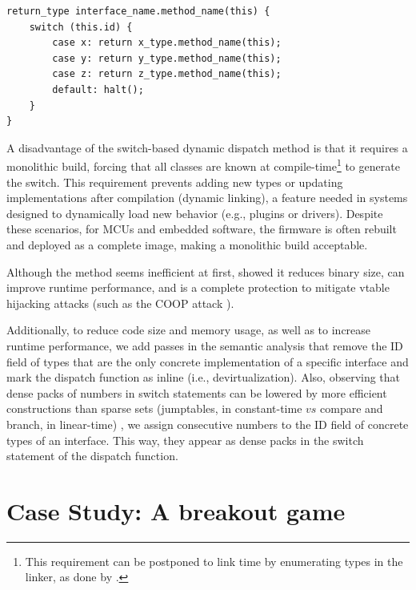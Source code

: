 \documentclass[10pt,sigplan,screen,anonymous]{acmart}
\begin{document}
\begin{lstlisting}[float=tp,caption=Interface switch-based template for dynamic dispatch using the id field., label=lst:interfacestub]
return_type interface_name.method_name(this) {
    switch (this.id) {
        case x: return x_type.method_name(this);
        case y: return y_type.method_name(this);
        case z: return z_type.method_name(this);
        default: halt();
    }
}
\end{lstlisting}


A disadvantage of the switch-based dynamic dispatch method is that it requires a monolithic build, forcing that all classes are known at compile-time\footnote{This requirement can be postponed to link time by enumerating types in the linker, as done by \citet{bauer2021novt}.} to generate the switch. This requirement prevents adding new types or updating implementations after compilation (dynamic linking), a feature needed in systems designed to dynamically load new behavior (e.g., plugins or drivers). Despite these scenarios, for MCUs and embedded software, the firmware is often rebuilt and deployed as a complete image, making a monolithic build acceptable.

Although the method seems inefficient at first, \citet{bauer2021novt} showed it reduces binary size, can improve runtime performance, and is a complete protection to mitigate vtable hijacking attacks (such as the COOP attack \cite{schuster2015}). 

Additionally, to reduce code size and memory usage, as well as to increase runtime performance, we add passes in the semantic analysis that remove the ID field of types that are the only concrete implementation of a specific interface and mark the dispatch function as inline (i.e., devirtualization). Also, observing that dense packs of numbers in switch statements can be lowered by more efficient constructions than sparse sets (jumptables, in constant-time $vs$ compare and branch, in linear-time) \cite[Chap. 6]{scott2016plp}, we assign consecutive numbers to the ID field of concrete types of an interface. This way, they appear as dense packs in the switch statement of the dispatch function. 


\section{Case Study: A breakout game} \label{sec:breakout}
\end{document}
